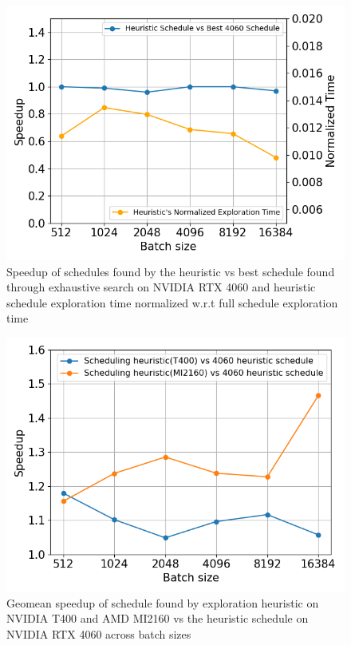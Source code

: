\begin{figure}[htb]
  \centering
  \includegraphics[width=0.75\linewidth]{figures/speedup_vs_norm_time_line_graph_4060.png}
  \caption{Speedup of schedules found by the heuristic vs best schedule found through exhaustive search on NVIDIA RTX 4060 and 
  heuristic schedule exploration time normalized w.r.t full schedule exploration time}
  \label{Fig:HeuristicVsFullExplore_Speedup}
\end{figure}

\begin{figure}[htb]
  \centering
  \includegraphics[width=0.75\linewidth]{figures/geomean_speedup_T400_4060_vs_T400_vs_MI2160.png}
  \caption{Geomean speedup of schedule found by exploration heuristic on NVIDIA T400 and AMD MI2160 vs 
  the heuristic schedule on NVIDIA RTX 4060 across batch sizes}
  \label{Fig:AutotuningSpeedupvs4060Sched}
\end{figure}



